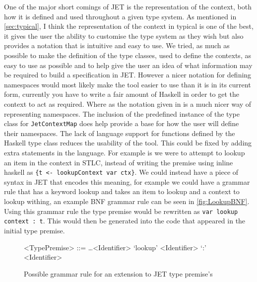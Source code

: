 One of the major short comings of JET is the representation of the context, both how it is defined and used throughout a given type system.
As mentioned in \autoref{sec:typical}, I think the representation of the context in typical is one of the best, it gives the user the ability to customise the type system as they wish but also provides a notation that is intuitive and easy to use.
We tried, as much as possible to make the definition of the type classes, used to define the contexts, as easy to use as possible and to help give the user an idea of what information may be required to build a specification in JET.
However a nicer notation for defining namespaces would most likely make the tool easier to use than it is in its current form, currently you have to write a fair amount of Haskell in order to get the context to act as required.
Where as the notation given in \textcite{grimm2007typical} is a much nicer way of representing namespaces.
The inclusion of the predefined instance of the type class for \texttt{JetContextMap} does help provide a base for how the user will define their namespaces.
The lack of language support for functions defined by the Haskell type class reduces the usability of the tool.
This could be fixed by adding extra statements in the language.
For example is we were to attempt to lookup an item in the context in STLC, instead of writing the premise using inline haskell as \texttt{\{t <- lookupContext var ctx\}}.
We could instead have a piece of syntax in JET that encodes this meaning, for example we could have a grammar rule that has a keyword lookup and takes an item to lookup and a context to lookup withing, an example BNF grammar rule can be seen in \autoref{fig:LookupBNF}.
Using this grammar rule the type premise would be rewritten as \texttt{var lookup context : t}.
This would then be generated into the code that appeared in the initial type premise.

\begin{figure}[]
    \centering
    \begin{grammar}
        <TypePremise> ::= \dots \alt <Identifier> `lookup' <Identifier> `:' <Identifier>
    \end{grammar}
    \caption{Possible grammar rule for an extension to JET type premise's}
    \label{fig:LookupBNF}
\end{figure}


